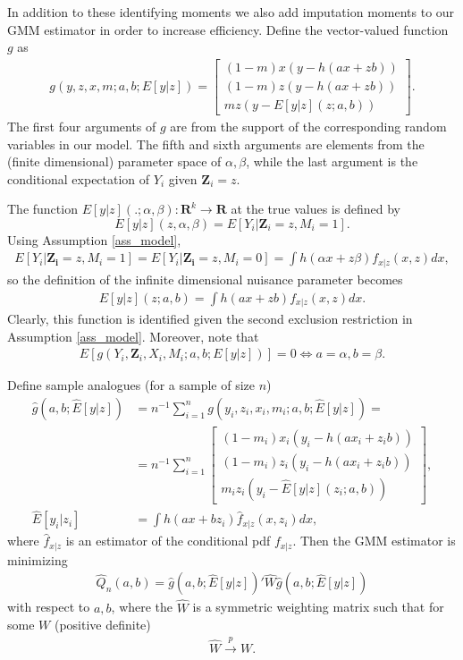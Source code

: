 \documentclass{article}
\theoremstyle{definition}
\theoremstyle{remark}
\begin{document}
In addition to these identifying moments we also add imputation moments to our GMM estimator in order to increase efficiency. Define the vector-valued function $g$ as
\begin{align}
    g(y,z,x,m; a,b; E[y|z])=\left[\begin{array}{c}
        (1-m) x(y- h(a x+zb))  \\
        (1-m) z(y- h(a x+z b)) \\
          m z(y- E[y|z](z; a, b))
    \end{array}\right].
\end{align}
The first four arguments of $g$ are from the support of the corresponding random variables in our model. The fifth and sixth arguments are elements from  the (finite dimensional) parameter space of $\alpha, \beta$, while the last argument is the conditional expectation of $Y_i$ given $\mathbf{Z}_i=z$.

The function $E[y|z](.; \alpha, \beta): \mathbf{R}^k \rightarrow \mathbf{R}$ at the true values is defined by
\[E[y|z](z, \alpha, \beta)= E[Y_i| \mathbf{Z}_i=z, M_i=1]. 
\]
Using Assumption \ref{ass_model},
\begin{align}
    E[Y_i|\mathbf{Z_i}=z, M_i=1]=E[Y_i|\mathbf{Z_i}=z, M_i=0]= \int h(\alpha x + z \beta) f_{x|z}(x,z) dx,
\end{align}
so the definition of the infinite dimensional nuisance parameter becomes
\begin{align}
E[y|z](z; a, b) = \int h(a x + z b) f_{x|z}(x,z) dx.
\end{align}
Clearly, this function is identified given the second exclusion restriction in Assumption \ref{ass_model}. Moreover, note that
\begin{align}
E[g(Y_i,\mathbf{Z}_i,X_i,M_i; a,b; E[y|z])]=0 \iff a=\alpha, b=\beta.
\end{align}

Define sample analogues (for a sample of size $n$)
\begin{align}
    \hat{g}(a,b; \hat{E}[y|z])&=n^{-1}\sum_{i=1}^n g(y_i,z_i,x_i,m_i; a,b; \hat{E}[y|z])= \\
    &=n^{-1}\sum_{i=1}^n\left[\begin{array}{c}
        (1-m_i) x_i(y_i- h(ax_i+z_i b))  \\
        (1-m_i) z_i(y_i- h(ax_i+z_i b)) \\
          m_i z_i(y_i- \hat{E}[y|z](z_i; a,b))
    \end{array}\right], \nonumber \\
    \hat{E}[y_i|z_i]&= \int h(a x+b z_i) \hat{f}_{x|z}(x,z_i)dx,
\end{align}
where $\hat{f}_{x|z}$ is an estimator of the conditional pdf $f_{x|z}$. Then the GMM estimator is minimizing
\begin{align}
    \hat{Q}_n(a,b)= \hat{g}(a,b;\hat{E}[y|z])'\hat{W}\hat{g}(a,b;\hat{E}[y|z])
\end{align}
with respect to $a,b$, where the $\hat{W}$ is a symmetric weighting matrix such that for some $W$ (positive definite)
\begin{align}
    \hat{W} \stackrel{p}{\rightarrow}W.
\end{align}
\end{document}
